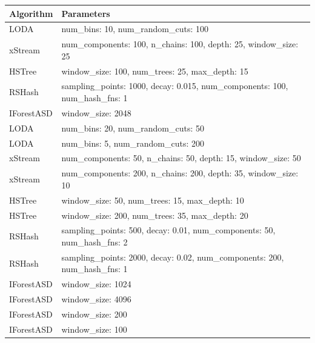 \begin{tabular}{ll}
\toprule
Algorithm & Parameters \\
\midrule
LODA & num_bins: 10, num_random_cuts: 100 \\
xStream & num_components: 100, n_chains: 100, depth: 25, window_size: 25 \\
HSTree & window_size: 100, num_trees: 25, max_depth: 15 \\
RSHash & sampling_points: 1000, decay: 0.015, num_components: 100, num_hash_fns: 1 \\
IForestASD & window_size: 2048 \\
LODA & num_bins: 20, num_random_cuts: 50 \\
LODA & num_bins: 5, num_random_cuts: 200 \\
xStream & num_components: 50, n_chains: 50, depth: 15, window_size: 50 \\
xStream & num_components: 200, n_chains: 200, depth: 35, window_size: 10 \\
HSTree & window_size: 50, num_trees: 15, max_depth: 10 \\
HSTree & window_size: 200, num_trees: 35, max_depth: 20 \\
RSHash & sampling_points: 500, decay: 0.01, num_components: 50, num_hash_fns: 2 \\
RSHash & sampling_points: 2000, decay: 0.02, num_components: 200, num_hash_fns: 1 \\
IForestASD & window_size: 1024 \\
IForestASD & window_size: 4096 \\
IForestASD & window_size: 200 \\
IForestASD & window_size: 100 \\
\bottomrule
\end{tabular}
